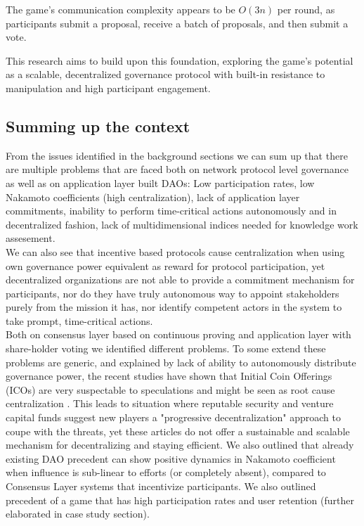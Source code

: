 \documentclass{article}
\begin{document}
\begin{CJK}{UTF8}{gbsn}
\begin{multicols}{2}
        The game's communication complexity appears to be $O(3n)$ per round, as participants submit a proposal, receive a batch of proposals, and then submit a vote.

        This research aims to build upon this foundation, exploring the game's potential as a scalable, decentralized governance protocol with built-in resistance to manipulation and high participant engagement.


        \subsection{Summing up the context}
        From the issues identified in the background sections we can sum up that there are multiple problems that are faced both on network protocol level governance as well as on application layer built DAOs: Low participation rates, low Nakamoto coefficients (high centralization), lack of application layer commitments, inability to perform time-critical actions autonomously and in decentralized fashion, lack of multidimensional indices needed for knowledge work assesement.\\
        We can also see that incentive based protocols cause centralization when using own governance power equivalent as reward for protocol participation, yet decentralized organizations are not able to provide a commitment mechanism for participants, nor do they have truly autonomous way to appoint stakeholders purely from the mission it has, nor identify competent actors in the system to take prompt, time-critical actions.\\
        Both on consensus layer based on continuous proving and application layer with share-holder voting we identified different problems. To some extend these problems are generic, and explained by lack of ability to autonomously distribute governance power, the recent studies have shown that Initial Coin Offerings (ICOs) are very suspectable to speculations and might be seen as root cause centralization \cite{Johannes24}. This leads to situation where reputable security and venture capital funds suggest new players a "progressive decentralization" approach to coupe with the threats\cite{a16z20}\cite{Webber23}, yet these articles do not offer a sustainable and scalable mechanism for decentralizing and staying efficient.
        We also outlined that already existing DAO precedent can show positive dynamics in Nakamoto coefficient when influence is sub-linear to efforts (or completely absent), compared to Consensus Layer systems that incentivize participants. We also outlined precedent of a game that has high participation rates and user retention (further elaborated in case study section).\\


\end{multicols}
\end{CJK}
\end{document}
